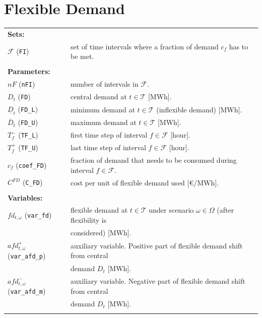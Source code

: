 \documentclass{article}
\begin{document}
\section{Flexible Demand}
\label{SEC:FlexibleDemand}

\begin{tabularx}{\textwidth}{l l}
    \textbf{Sets:} \\
    $\mathcal{F}$ (\verb|FI|) & set of time intervals where a fraction of demand $c_f$ has to be met. \\ 
    \\
    
    \textbf{Parameters:} \\
    	$nF$ (\verb|nFI|) & number of intervals in $\mathcal{F}$. \\
    $D_t$ (\verb|FD|) & central demand at $t \in \mathcal{T}$ [MWh]. \\
    $\underline{D}_t$ (\verb|FD_L|) & minimum demand at $t \in \mathcal{T}$ (inflexible demand) [MWh]. \\
    $\overline{D}_t$ (\verb|FD_U|) & maximum demand at $t \in \mathcal{T}$ [MWh]. \\
    $T_f^-$ (\verb|TF_L|) & first time step of interval $f \in \mathcal{F}$ [hour]. \\
    $T_f^+$ (\verb|TF_U|) & last time step of interval $f \in \mathcal{F}$ [hour]. \\
    $c_f$ (\verb|coef_FD|) & fraction of demand that needs to be consumed during interval $f \in \mathcal{F}$. \\
    $C^{FD}$ (\verb|C_FD|) & cost per unit of flexible demand used [\euro/MWh]. \\
    \\
       
    \textbf{Variables:} \\
    $fd_{t, \omega}$ (\verb|var_fd|) & flexible demand at $t \in \mathcal{T}$ under scenario $\omega \in \Omega$ (after flexibility is \\
    & considered) [MWh]. \\
    $afd_{t, \omega}^+$ (\verb|var_afd_p|) & auxiliary variable. Positive part of flexible demand shift from central \\
    & demand $D_t$ [MWh]. \\
    $afd_{t, \omega}^-$ (\verb|var_afd_m|) & auxiliary variable. Negative part of flexible demand shift from central \\
    & demand $D_t$ [MWh]. \\
    \\
    \end{tabularx}
\end{document}
